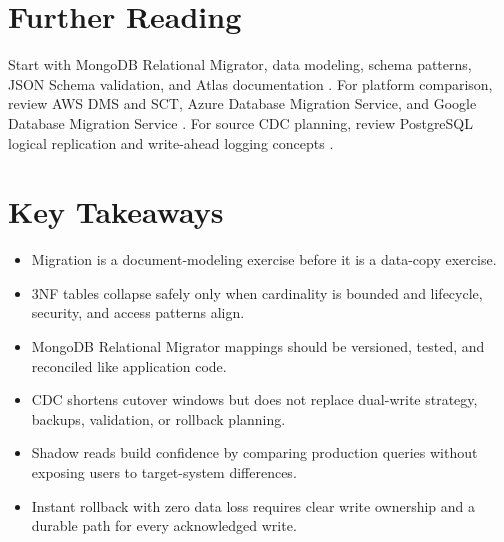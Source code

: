 \section{Further Reading}
Start with MongoDB Relational Migrator, data modeling, schema patterns, JSON Schema validation, and Atlas documentation \cite{mongodbRelationalMigratorDocs,mongodbDataModelingDocs,mongodbSchemaPatternsDocs,mongodbJsonSchemaDocs}. For platform comparison, review AWS DMS and SCT, Azure Database Migration Service, and Google Database Migration Service \cite{awsDmsDocs,awsSctDocs,azureDmsDocs,gcpDmsDocs}. For source CDC planning, review PostgreSQL logical replication and write-ahead logging concepts \cite{postgresLogicalReplicationDocs,postgresWalDocs}.

\section*{Key Takeaways}
\begin{itemize}
    \item Migration is a document-modeling exercise before it is a data-copy exercise.
    \item 3NF tables collapse safely only when cardinality is bounded and lifecycle, security, and access patterns align.
    \item MongoDB Relational Migrator mappings should be versioned, tested, and reconciled like application code.
    \item CDC shortens cutover windows but does not replace dual-write strategy, backups, validation, or rollback planning.
    \item Shadow reads build confidence by comparing production queries without exposing users to target-system differences.
    \item Instant rollback with zero data loss requires clear write ownership and a durable path for every acknowledged write.
\end{itemize}

